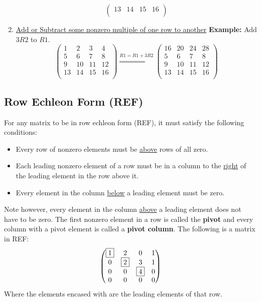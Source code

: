 \documentclass[a4paper]{article}
\begin{document}
\begin{enumerate}
\[\begin{pmatrix}
          13 & 14 & 15 & 16 \\  
        \end{pmatrix}
      \]
    \item \underline{Add or Subtract some nonzero multiple of one row to another}\newline
      \textbf{Example:} Add $3R2$ to $R1$.
      \[
        \begin{pmatrix}
          1 & 2 & 3 & 4 \\  
          5 & 6 & 7 & 8 \\  
          9 & 10 & 11 & 12 \\  
          13 & 14 & 15 & 16 \\  
        \end{pmatrix} \overset{R1 = R1 + 3R2}{\Rightarrow}
        \begin{pmatrix}
          16 & 20 & 24 & 28 \\  
          5 & 6 & 7 & 8 \\  
          9 & 10 & 11 & 12 \\  
          13 & 14 & 15 & 16 \\  
        \end{pmatrix}
      \]
  \end{enumerate}
  \subsection{Row Echleon Form (REF)}
  For any matrix to be in row echleon form (REF), it must satisfy the following conditions:
  \begin{itemize}
    \item Every row of nonzero elements must be \underline{above} rows of all zero.
    \item Each leading nonzero element of a row must be in a column to the \underline{right} of the leading element in the row above it.
    \item Every element in the column \underline{below} a leading element must be zero.
  \end{itemize}
  Note however, every element in the column \underline{above} a leading element does not have to be zero. The first nonzero element in a row is called the \textbf{pivot} and every column with a pivot element is called a \textbf{pivot column}. The following is a matrix in REF:
  \[
    \begin{pmatrix}
      \fbox{1} & 2 & 0 & 1 \\  
      0 & \fbox{2} & 3 & 1 \\  
      0 & 0 & \fbox{4} & 0 \\  
      0 & 0 & 0 & 0 \\  
    \end{pmatrix}
  \]
  Where the elements encased with  are the leading elements of that row.
\end{document}
